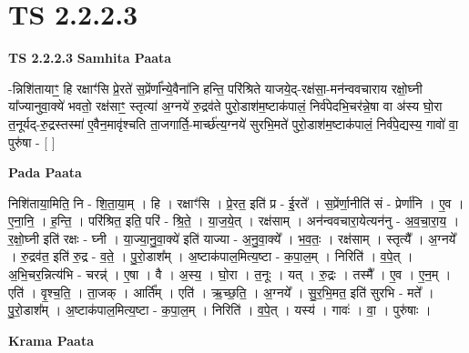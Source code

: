 \documentclass[17pt]{extarticle}
\begin{document}
\section*{ TS 2.2.2.3 }

\textbf{TS 2.2.2.3 } \newline
\textbf{Samhita Paata} \newline

-न्निशि॑तायाꣳ॒॒ हि रक्षाꣳ॑सि प्रे॒रते॑ स॒प्रेंर्णा᳚न्ये॒वैना॑नि हन्ति॒ परि॑श्रिते याजये॒द्-रक्ष॑सा॒-मन॑न्ववचाराय रक्षो॒घ्नी या᳚ज्यानुवा॒क्ये॑ भवतो॒ रक्ष॑साꣳ॒॒ स्तृत्या॑ अ॒ग्नये॑ रु॒द्रव॑ते पुरो॒डाश॑म॒ष्टाक॑पालं॒ निर्व॑पेदभि॒चर॑न्ने॒षा वा अ॑स्य घो॒रा त॒नूर्यद्-रु॒द्रस्तस्मा॑ ए॒वैन॒मावृ॑श्चति ता॒जगार्ति॒-मार्च्छ॑त्य॒ग्नये॑ सुरभि॒मते॑ पुरो॒डाश॑म॒ष्टाक॑पालं॒ निर्व॑पे॒द्यस्य॒ गावो॑ वा॒ पुरु॑षा - [  ] \newline

\textbf{Pada Paata} \newline

निशि॑ताया॒मिति॒ नि - शि॒ता॒या॒म् । हि । रक्षाꣳ॑सि । प्रे॒रत॒ इति॑ प्र - ई॒रते᳚ । स॒प्रेंर्णा॒नीति॑ सं - प्रेर्णा॑नि । ए॒व । ए॒ना॒नि॒ । ह॒न्ति॒ । परि॑श्रित॒ इति॒ परि॑ - श्रि॒ते॒ । या॒ज॒ये॒त् । रक्ष॑साम् । अन॑न्ववचारा॒येत्यन॑नु - अ॒व॒चा॒रा॒य॒ । र॒क्षो॒घ्नी इति॑ रक्षः - घ्नी । या॒ज्या॒नु॒वा॒क्ये॑ इति॑ याज्या - अ॒नु॒वा॒क्ये᳚ । भ॒व॒तः॒ । रक्ष॑साम् । स्तृत्यै᳚ । अ॒ग्नये᳚ । रु॒द्रव॑त॒ इति॑ रु॒द्र - व॒ते॒ । पु॒रो॒डाश᳚म् । अ॒ष्टाक॑पाल॒मित्य॒ष्टा - क॒पा॒ल॒म् । निरिति॑ । व॒पे॒त् । अ॒भि॒चर॒न्नित्य॑भि - चरन्न्॑ । ए॒षा । वै । अ॒स्य॒ । घो॒रा । त॒नूः । यत् । रु॒द्रः । तस्मै᳚ । ए॒व । ए॒न॒म् । एति॑ । वृ॒श्च॒ति॒ । ता॒जक् । आर्ति᳚म् । एति॑ । ऋ॒च्छ॒ति॒ । अ॒ग्नये᳚ । सु॒र॒भि॒मत॒ इति॑ सुरभि - मते᳚ । पु॒रो॒डाश᳚म् । अ॒ष्टाक॑पाल॒मित्य॒ष्टा - क॒पा॒ल॒म् । निरिति॑ । व॒पे॒त् । यस्य॑ । गावः॑ । वा॒ । पुरु॑षाः ।  \newline


\textbf{Krama Paata} \newline
\end{document}
